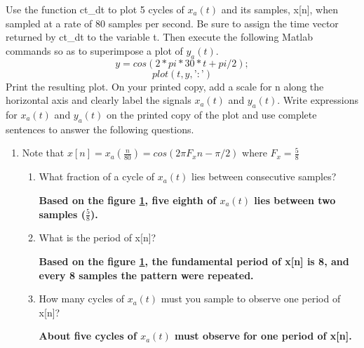 \documentclass[12pt]{article}
\begin{document}
\begin{enumerate}
Use the function ct\_dt to plot 5 cycles of $x_a(t)$ and its samples, x[n], when sampled at a rate of 80 samples per second. Be sure to assign the time vector returned by ct\_dt to the variable t. Then execute the following Matlab commands so as to superimpose a plot of $y_a(t)$.
$$
     y = cos(2*pi*30*t + pi/2);
     $$
     $$
     plot(t,y,’:’)
     $$
Print the resulting plot. On your printed copy, add a scale for n along the horizontal axis and clearly label the signals $x_a(t)$ and $y_a(t)$. Write expressions for $x_a(t)$ and $y_a(t)$ on the printed copy of the plot and use complete sentences to answer the following questions.

\begin{enumerate}
\begin{figure}[H]
    \centering
    \begin{minipage}[b]{0.7\textwidth}
        \texttt{[image: images/31.jpg]}
    \end{minipage}
    \caption{The plot of $x_a(t)$, $y_a(t)$, x[n], and y[n].}
    \label{fig:31}
\end{figure}
\item Note that $x[n] = x_a(\frac{n}{80}) = cos(2\pi F_x n-\pi/2)$ where $F_x = \frac{5}{8}$
\begin{enumerate}



\item What fraction of a cycle of $x_a(t)$ lies between consecutive samples?

\textbf{Based on the figure \ref{fig:31}, five eighth of $x_a(t)$ lies between two samples ($\frac{5}{8}$).}



\item What is the period of x[n]?

\textbf{Based on the figure \ref{fig:31}, the fundamental period of x[n] is 8, and every 8 samples the pattern were repeated.}




\item How many cycles of $x_a(t)$ must you sample to observe one period of x[n]?


\textbf{About five cycles of $x_a(t)$ must observe for one period of x[n].}

\end{enumerate}









\end{enumerate}
\end{enumerate}
\end{document}
